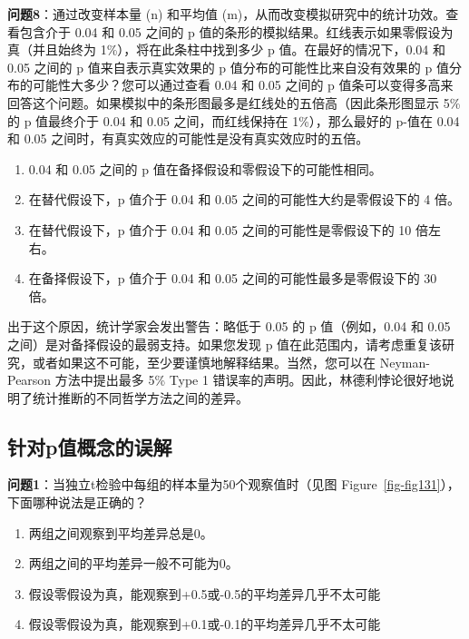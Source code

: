 \documentclass[
  letterpaper,
  DIV=11,
  numbers=noendperiod]{scrreprt}
\providecommand{\tightlist}{%
  \setlength{\itemsep}{0pt}\setlength{\parskip}{0pt}}\usepackage{longtable,booktabs,array}
\begin{document}
\textbf{问题8}：通过改变样本量 (n) 和平均值
(m)，从而改变模拟研究中的统计功效。查看包含介于 0.04 和 0.05 之间的 p
值的条形的模拟结果。红线表示如果零假设为真（并且始终为
1\%），将在此条柱中找到多少 p 值。在最好的情况下，0.04 和 0.05 之间的 p
值来自表示真实效果的 p 值分布的可能性比来自没有效果的 p
值分布的可能性大多少？您可以通过查看 0.04 和 0.05 之间的 p
值条可以变得多高来回答这个问题。如果模拟中的条形图最多是红线处的五倍高（因此条形图显示
5\% 的 p 值最终介于 0.04 和 0.05 之间，而红线保持在 1\%），那么最好的
p-值在 0.04 和 0.05 之间时，有真实效应的可能性是没有真实效应时的五倍。

\begin{enumerate}
\def\labelenumi{\Alph{enumi})}
\tightlist
\item
  0.04 和 0.05 之间的 p 值在备择假设和零假设下的可能性相同。
\item
  在替代假设下，p 值介于 0.04 和 0.05 之间的可能性大约是零假设下的 4
  倍。
\item
  在替代假设下，p 值介于 0.04 和 0.05 之间的可能性是零假设下的 10
  倍左右。
\item
  在备择假设下，p 值介于 0.04 和 0.05 之间的可能性最多是零假设下的 30
  倍。
\end{enumerate}

出于这个原因，统计学家会发出警告：略低于 0.05 的 p 值（例如，0.04 和
0.05 之间）是对备择假设的最弱支持。如果您发现 p
值在此范围内，请考虑重复该研究，或者如果这不可能，至少要谨慎地解释结果。当然，您可以在
Neyman-Pearson 方法中提出最多 5\% Type 1
错误率的声明。因此，林德利悖论很好地说明了统计推断的不同哲学方法之间的差异。

\hypertarget{ux9488ux5bf9pux503cux6982ux5ff5ux7684ux8befux89e3}{%
\subsection{针对p值概念的误解}\label{ux9488ux5bf9pux503cux6982ux5ff5ux7684ux8befux89e3}}

\textbf{问题1}：当独立t检验中每组的样本量为50个观察值时（见图
Figure~\ref{fig-fig131}），下面哪种说法是正确的？

\begin{enumerate}
\def\labelenumi{\Alph{enumi})}
\tightlist
\item
  两组之间观察到平均差异总是0。
\item
  两组之间的平均差异一般不可能为0。
\item
  假设零假设为真，能观察到+0.5或-0.5的平均差异几乎不太可能
\item
  假设零假设为真，能观察到+0.1或-0.1的平均差异几乎不太可能
\end{enumerate}
\end{document}
